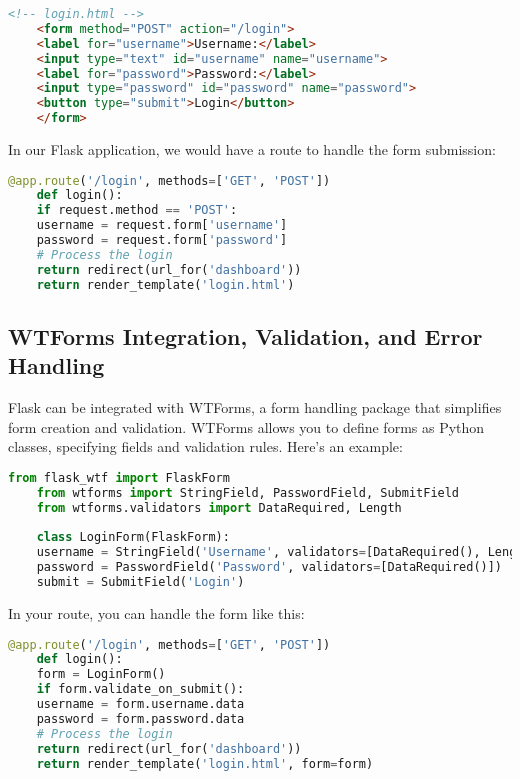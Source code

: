 \begin{lstlisting}[language=HTML]
	<!-- login.html -->
	<form method="POST" action="/login">
	<label for="username">Username:</label>
	<input type="text" id="username" name="username">
	<label for="password">Password:</label>
	<input type="password" id="password" name="password">
	<button type="submit">Login</button>
	</form>
\end{lstlisting}

In our Flask application, we would have a route to handle the form submission:

\begin{lstlisting}[language=Python]
	@app.route('/login', methods=['GET', 'POST'])
	def login():
	if request.method == 'POST':
	username = request.form['username']
	password = request.form['password']
	# Process the login
	return redirect(url_for('dashboard'))
	return render_template('login.html')
\end{lstlisting}

\subsection{WTForms Integration, Validation, and Error Handling}

Flask can be integrated with WTForms, a form handling package that simplifies form creation and validation. WTForms allows you to define forms as Python classes, specifying fields and validation rules. Here’s an example:

\begin{lstlisting}[language=Python]
	from flask_wtf import FlaskForm
	from wtforms import StringField, PasswordField, SubmitField
	from wtforms.validators import DataRequired, Length
	
	class LoginForm(FlaskForm):
	username = StringField('Username', validators=[DataRequired(), Length(min=4, max=25)])
	password = PasswordField('Password', validators=[DataRequired()])
	submit = SubmitField('Login')
\end{lstlisting}

In your route, you can handle the form like this:

\begin{lstlisting}[language=Python]
	@app.route('/login', methods=['GET', 'POST'])
	def login():
	form = LoginForm()
	if form.validate_on_submit():
	username = form.username.data
	password = form.password.data
	# Process the login
	return redirect(url_for('dashboard'))
	return render_template('login.html', form=form)
\end{lstlisting}

